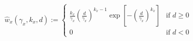 \begin{equation}
\hat{w}_x(\gamma_x,k_x,d) :=
	\begin{cases}
		\frac{k_x}{\gamma_x}\left(\frac{d}{\gamma_x}\right)^{k_x-1}\exp\left[-\left(\frac{d}{\gamma_x}\right)^{k_x}\right] &\text{if } d \geq 0 \\
		0 &\text{if } d < 0
	\end{cases}
	\label{ch4:equ:weibull-distribution}
\end{equation}
